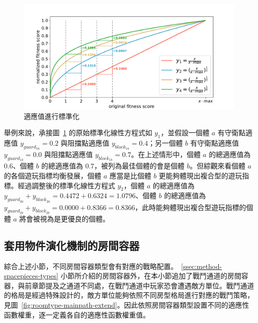 \begin{figure}[!htb]
  \begin{center}
    \includegraphics[width=1.0\textwidth]{figures/fitnesses-normalized.pdf}
    \caption{適應值進行標準化}
    \label{fig:fitnesses-normalized}
  \end{center}
\end{figure}

舉例來說，承接圖~\ref{fig:fitnesses-normalized} 的原始標準化線性方程式如 $y_{1}$，並假設一個體 $a$ 有守衛點適應值 $y_{guard_{1a}} = 0.2$ 與阻擋點適應值 $y_{block_{1a}} = 0.4$；另一個體 $b$ 有守衛點適應值 $y_{guard_{1b}} = 0.0$ 與阻擋點適應值 $y_{block_{1b}} = 0.7$。在上述情形中，個體 $a$ 的總適應值為 $0.6$、個體 $b$ 的總適應值為 $0.7$，被列為最佳個體的會是個體 $b$。但綜觀來看個體 $a$ 的各個遊玩指標均衡發展，個體 $a$ 應當是比個體 $b$ 更能夠體現出複合型的遊玩指標。經過調整後的標準化線性方程式 $y_{2}$，個體 $a$ 的總適應值為 $y_{guard_{2a}} + y_{block_{2a}} = 0.4472 + 0.6324 = 1.0796$、個體 $b$ 的總適應值為 $y_{guard_{2b}} + y_{block_{2b}} = 0.0000 + 0.8366 = 0.8366$，此時能夠體現出複合型遊玩指標的個體 $a$ 將會被視為是更優良的個體。

\subsection{套用物件演化機制的房間容器}
\label{ssec:method-segments-appliedonvolumes}

綜合上述小節，不同房間容器類型會有對應的戰略配置。~\ref{ssec:method-spacepieces-types} 小節所介紹的房間容器外，在本小節追加了戰鬥通道的房間容器，與前章節提及之通道不同處，在戰鬥通道中玩家恐會遭遇敵方單位。戰鬥通道的格局是經過特殊設計的，敵方單位能夠依照不同房型格局進行對應的戰鬥策略，見圖~\ref{fig:roomtype-mainpath-extend}。因此依照房間容器類型設置不同的適應性函數權重，逐一定義各自的適應性函數權重值。

